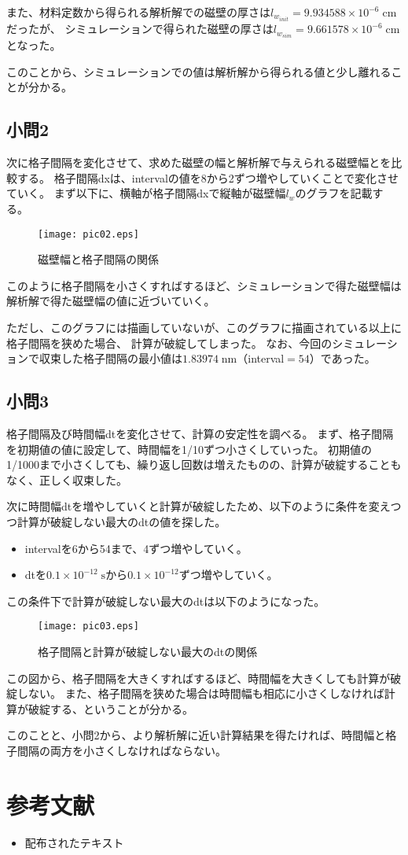 \documentclass{jsarticle}
\begin{document}
また、材料定数から得られる解析解での磁壁の厚さは$l_{w_{init}} = 9.934588\times 10^{-6}\;\mathrm{cm}$だったが、
シミュレーションで得られた磁壁の厚さは$l_{w_{sim}} = 9.661578\times 10^{-6}\;\mathrm{cm}$となった。

このことから、シミュレーションでの値は解析解から得られる値と少し離れることが分かる。

\subsection{小問2}
次に格子間隔を変化させて、求めた磁壁の幅と解析解で与えられる磁壁幅とを比較する。
格子間隔dxは、intervalの値を8から2ずつ増やしていくことで変化させていく。
まず以下に、横軸が格子間隔dxで縦軸が磁壁幅$l_w$のグラフを記載する。
\begin{figure}[H]
	\centering
	\texttt{[image: pic02.eps]}
	\caption{磁壁幅と格子間隔の関係}
	\label{fig02}
\end{figure}

このように格子間隔を小さくすればするほど、シミュレーションで得た磁壁幅は
解析解で得た磁壁幅の値に近づいていく。

ただし、このグラフには描画していないが、このグラフに描画されている以上に格子間隔を狭めた場合、
計算が破綻してしまった。
なお、今回のシミュレーションで収束した格子間隔の最小値は$1.83974\;\mathrm{nm}$（interval$=54$）であった。

\subsection{小問3}
格子間隔及び時間幅dtを変化させて、計算の安定性を調べる。
まず、格子間隔を初期値の値に設定して、時間幅を1/10ずつ小さくしていった。
初期値の1/1000まで小さくしても、繰り返し回数は増えたものの、計算が破綻することもなく、正しく収束した。

次に時間幅dtを増やしていくと計算が破綻したため、以下のように条件を変えつつ計算が破綻しない最大のdtの値を探した。
\begin{itemize}
 \item intervalを6から54まで、4ずつ増やしていく。
 \item dtを$0.1\times 10^{-12}\;\mathrm{s}$から$0.1\times 10^{-12}$ずつ増やしていく。
\end{itemize}
この条件下で計算が破綻しない最大のdtは以下のようになった。
\begin{figure}[H]
	\centering
	\texttt{[image: pic03.eps]}
	\caption{格子間隔と計算が破綻しない最大のdtの関係}
	\label{fig03}
\end{figure}

この図から、格子間隔を大きくすればするほど、時間幅を大きくしても計算が破綻しない。
また、格子間隔を狭めた場合は時間幅も相応に小さくしなければ計算が破綻する、ということが分かる。

このことと、小問2から、より解析解に近い計算結果を得たければ、時間幅と格子間隔の両方を小さくしなければならない。

\section{参考文献}

\begin{itemize}
  \item 配布されたテキスト
\end{itemize}
\end{document}
